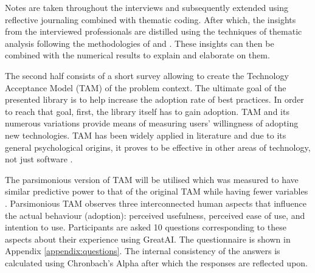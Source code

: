 Notes are taken throughout the interviews and subsequently extended using reflective journaling \cite{halcomb2006verbatim} combined with thematic coding. After which, the insights from the interviewed professionals are distilled using the techniques of thematic analysis \cite{fereday2006demonstrating} following the methodologies of \cite{cruz2019catalog} and \cite{haakman2021ai}. These insights can then be combined with the numerical results to explain and elaborate on them. 

The second half consists of a short survey allowing to create the Technology Acceptance Model (TAM) \cite{davis1989perceived} of the problem context. The ultimate goal of the presented library is to help increase the adoption rate of best practices. In order to reach that goal, first, the library itself has to gain adoption. TAM and its numerous variations provide means of measuring users' willingness of adopting new technologies. TAM has been widely applied in literature \cite{marangunic2015technology} and due to its general psychological origins, it proves to be effective in other areas of technology, not just software \cite{riemenschneider2002explaining}. 

The parsimonious version of TAM will be utilised which was measured to have similar predictive power to that of the original TAM while having fewer variables \cite{wu2011user}. Parsimonious TAM observes three interconnected human aspects that influence the actual behaviour (adoption): perceived usefulness, perceived ease of use, and intention to use. Participants are asked 10 questions corresponding to these aspects about their experience using GreatAI. The questionnaire is shown in Appendix \ref{appendix:questions}. The internal consistency of the answers is calculated using Chronbach's Alpha \cite{bland1997statistics} after which the responses are reflected upon.
